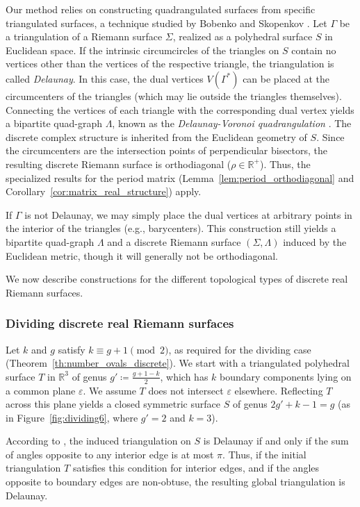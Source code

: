 \documentclass[11pt,a4paper]{article}
\theoremstyle{definition}
\begin{document}
Our method relies on constructing quadrangulated surfaces from specific triangulated surfaces, a technique studied by Bobenko and Skopenkov \cite{BoSk12}. Let $\Gamma$ be a triangulation of a Riemann surface $\Sigma$, realized as a polyhedral surface $S$ in Euclidean space.
If the intrinsic circumcircles of the triangles on $S$ contain no vertices other than the vertices of the respective triangle, the triangulation is called \textit{Delaunay}. In this case, the dual vertices $V(\Gamma^*)$ can be placed at the circumcenters of the triangles (which may lie outside the triangles themselves). Connecting the vertices of each triangle with the corresponding dual vertex yields a bipartite quad-graph $\Lambda$, known as the \textit{Delaunay-Voronoi quadrangulation} \cite{BoSk12}.
The discrete complex structure is inherited from the Euclidean geometry of $S$. Since the circumcenters are the intersection points of perpendicular bisectors, the resulting discrete Riemann surface is orthodiagonal ($\rho \in \mathds{R}^+$). Thus, the specialized results for the period matrix (Lemma~\ref{lem:period_orthodiagonal} and Corollary~\ref{cor:matrix_real_structure}) apply.

If $\Gamma$ is not Delaunay, we may simply place the dual vertices at arbitrary points in the interior of the triangles (e.g., barycenters). This construction still yields a bipartite quad-graph $\Lambda$ and a discrete Riemann surface $(\Sigma, \Lambda)$ induced by the Euclidean metric, though it will generally not be orthodiagonal.

We now describe constructions for the different topological types of discrete real Riemann surfaces.

\subsubsection*{Dividing discrete real Riemann surfaces}

Let $k$ and $g$ satisfy $k \equiv g+1 \pmod 2$, as required for the dividing case (Theorem~\ref{th:number_ovals_discrete}).
We start with a triangulated polyhedral surface $T$ in $\mathds{R}^3$ of genus $g' \coloneqq \frac{g+1-k}{2}$, which has $k$ boundary components lying on a common plane $\varepsilon$. We assume $T$ does not intersect $\varepsilon$ elsewhere. Reflecting $T$ across this plane yields a closed symmetric surface $S$ of genus $2g'+k-1 = g$ (as in Figure~\ref{fig:dividing6}, where $g'=2$ and $k=3$).

According to \cite{BoSp07}, the induced triangulation on $S$ is Delaunay if and only if the sum of angles opposite to any interior edge is at most $\pi$. Thus, if the initial triangulation $T$ satisfies this condition for interior edges, and if the angles opposite to boundary edges are non-obtuse, the resulting global triangulation is Delaunay.
\end{document}
